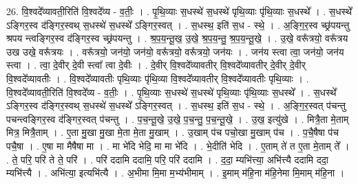 \documentclass[17pt]{extarticle}
\begin{document}
26. वि॒श्वदे᳚व्यावती॒रिति॑ वि॒श्वदे᳚व्य - व॒तीः॒ । . पृ॒थि॒व्याः स॒धस्थे॑ स॒धस्थे॑ पृथि॒व्याः पृ॑थि॒व्याः स॒धस्थे᳚ । . स॒धस्थे᳚ ऽङ्गिर॒स्व द॑ङ्गिर॒स्वथ् स॒धस्थे॑ स॒धस्थे᳚ ऽङ्गिर॒स्वत् । . स॒धस्थ॒ इति॑ स॒ध - स्थे॒ । . अ॒ङ्गि॒र॒स्व च्छ्र॑पयन्तु श्रपय न्त्वङ्गिर॒स्व द॑ङ्गिर॒स्व च्छ्र॑पयन्तु । . श्र॒प॒य॒न्तू॒ख॒ उ॒खे॒ श्र॒प॒य॒न्तु॒ श्र॒प॒य॒न्तू॒खे॒ । . उ॒खे॒ वरू᳚त्रयो॒ वरू᳚त्रय उख उखे॒ वरू᳚त्रयः । . वरू᳚त्रयो॒ जन॑यो॒ जन॑यो॒ वरू᳚त्रयो॒ वरू᳚त्रयो॒ जन॑यः । . जन॑य स्त्वा त्वा॒ जन॑यो॒ जन॑य स्त्वा । . त्वा॒ दे॒वीर् दे॒वी स्त्वा᳚ त्वा दे॒वीः । . दे॒वीर् वि॒श्वदे᳚व्यावतीर् वि॒श्वदे᳚व्यावतीर् दे॒वीर् दे॒वीर् वि॒श्वदे᳚व्यावतीः । . वि॒श्वदे᳚व्यावतीः पृथि॒व्याः पृ॑थि॒व्या वि॒श्वदे᳚व्यावतीर् वि॒श्वदे᳚व्यावतीः पृथि॒व्याः । . वि॒श्वदे᳚व्यावती॒रिति॑ वि॒श्वदे᳚व्य - व॒तीः॒ । . पृ॒थि॒व्याः स॒धस्थे॑ स॒धस्थे॑ पृथि॒व्याः पृ॑थि॒व्याः स॒धस्थे᳚ । . स॒धस्थे᳚ ऽङ्गिर॒स्व द॑ङ्गिर॒स्वथ् स॒धस्थे॑ स॒धस्थे᳚ ऽङ्गिर॒स्वत् । . स॒धस्थ॒ इति॑ स॒ध - स्थे॒ । . अ॒ङ्गि॒र॒स्वत् प॑चन्तु पचन्त्वङ्गिर॒स्व द॑ङ्गिर॒स्वत् प॑चन्तु । . प॒च॒न्तू॒खे॒ उ॒खे॒ प॒च॒न्तु॒ प॒च॒न्तू॒खे॒ । . उ॒ख॒ इत्यु॑खे । . मित्रै॒ता मे॒ताम् मित्र॒ मित्रै॒ताम् । . ए॒ता मु॒खा मु॒खा मे॒ता मे॒ता मु॒खाम् । . उ॒खाम् प॑च पचो॒खा मु॒खाम् प॑च । . प॒चै॒षैषा प॑च पचै॒षा । . ए॒षा मा मैषैषा मा । . मा भे॑दि भेदि॒ मा मा भे॑दि । . भे॒दीति॑ भेदि । . ए॒ताम् ते॑ त ए॒ता मे॒ताम् ते᳚ । . ते॒ परि॒ परि॑ ते ते॒ परि॑ । . परि॑ ददामि ददामि॒ परि॒ परि॑ ददामि । . द॒दा॒ म्यभि॑त्त्या॒ अभि॑त्त्यै ददामि ददा॒ म्यभि॑त्त्यै । . अभि॑त्या॒ इत्यभि॑त्यै । . अ॒भीमा मि॒मा म॒भ्य॑भीमाम् । . इ॒माम् म॑हि॒ना म॑हि॒नेमा मि॒माम् म॑हि॒ना । \newline
\end{document}
